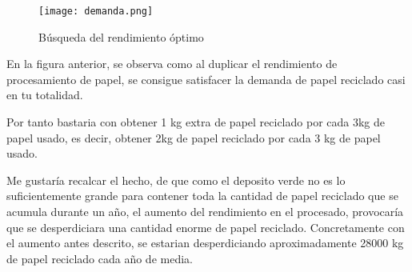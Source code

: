 \begin{figure}[H]
	\centering
	\texttt{[image: demanda.png]}
	\caption{Búsqueda del rendimiento óptimo}
\end{figure}

En la figura anterior, se observa como al duplicar el rendimiento de procesamiento de papel, se consigue satisfacer la demanda de papel reciclado casi en tu totalidad.

Por tanto bastaria con obtener 1 kg extra de papel reciclado por cada 3kg de papel usado, es decir, obtener 2kg de papel reciclado por cada 3 kg de papel usado.

Me gustaría recalcar el hecho, de que como el deposito verde no es lo suficientemente grande para contener toda la cantidad de papel reciclado que se acumula durante un año, el aumento del rendimiento en el procesado, provocaría que se desperdiciara una cantidad enorme de papel reciclado. Concretamente con el aumento antes descrito, se estarian desperdiciando aproximadamente 28000 kg de papel reciclado cada año de media.


